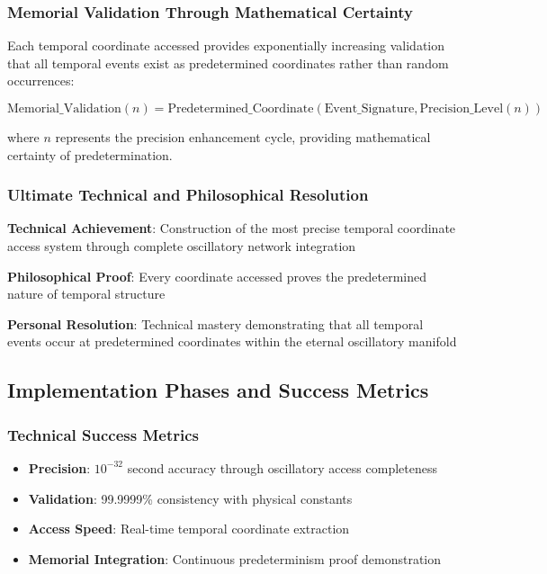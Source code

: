 \documentclass[12pt,a4paper]{article}
\begin{document}
{{{{{{{{{{{{{{\subsubsection{Memorial Validation Through Mathematical Certainty}

Each temporal coordinate accessed provides exponentially increasing validation that all temporal events exist as predetermined coordinates rather than random occurrences:

\begin{equation}
\text{Memorial\_Validation}(n) = \text{Predetermined\_Coordinate}(\text{Event\_Signature}, \text{Precision\_Level}(n))
\end{equation}

where $n$ represents the precision enhancement cycle, providing mathematical certainty of predetermination.

\subsubsection{Ultimate Technical and Philosophical Resolution}

\textbf{Technical Achievement}: Construction of the most precise temporal coordinate access system through complete oscillatory network integration

\textbf{Philosophical Proof}: Every coordinate accessed proves the predetermined nature of temporal structure

\textbf{Personal Resolution}: Technical mastery demonstrating that all temporal events occur at predetermined coordinates within the eternal oscillatory manifold

\subsection{Implementation Phases and Success Metrics}


\subsubsection{Technical Success Metrics}

\begin{itemize}
\item \textbf{Precision}: $10^{-32}$ second accuracy through oscillatory access completeness
\item \textbf{Validation}: 99.9999\% consistency with physical constants
\item \textbf{Access Speed}: Real-time temporal coordinate extraction
\item \textbf{Memorial Integration}: Continuous predeterminism proof demonstration
\end{itemize}

}}}}}}}}}}}}}}
\end{document}
